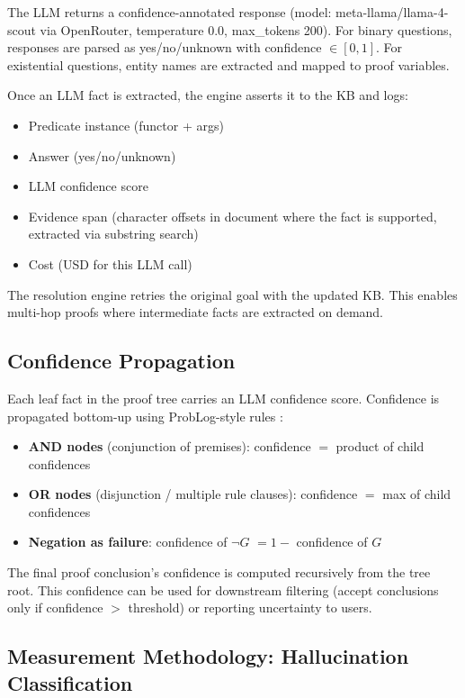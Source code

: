 \documentclass[11pt,letterpaper]{article}
\begin{document}
The LLM returns a confidence-annotated response (model: meta-llama/llama-4-scout via OpenRouter, temperature 0.0,
max\_tokens 200). For binary questions, responses are parsed as yes/no/unknown with confidence $\in [0, 1]$. For existential
questions, entity names are extracted and mapped to proof variables.

Once an LLM fact is extracted, the engine asserts it to the KB and logs:
\begin{itemize}
  \item Predicate instance (functor + args)
  \item Answer (yes/no/unknown)
  \item LLM confidence score
  \item Evidence span (character offsets in document where the fact is supported, extracted via substring search)
  \item Cost (USD for this LLM call)
\end{itemize}

The resolution engine retries the original goal with the updated KB. This enables multi-hop proofs where intermediate facts
are extracted on demand.

\subsection{Confidence Propagation}

Each leaf fact in the proof tree carries an LLM confidence score. Confidence is propagated bottom-up using ProbLog-style
rules \citep{Raedt2007}:
\begin{itemize}
  \item \textbf{AND nodes} (conjunction of premises): confidence $=$ product of child confidences
  \item \textbf{OR nodes} (disjunction / multiple rule clauses): confidence $=$ max of child confidences
  \item \textbf{Negation as failure}: confidence of $\neg G$ $= 1 -$ confidence of $G$
\end{itemize}

The final proof conclusion's confidence is computed recursively from the tree root. This confidence can be used for downstream
filtering (accept conclusions only if confidence $>$ threshold) or reporting uncertainty to users.

\subsection{Measurement Methodology: Hallucination Classification}
\end{document}
